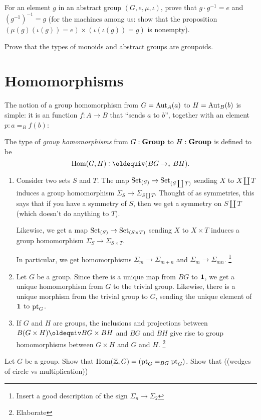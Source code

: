   \begin{xca}
    For an element $g$ in an abstract group $(G,e,\mu,\iota)$, prove that $g\cdot g^{-1}=e$ and $(g^{-1})^{-1}=g$ (for the machines among us: show that the proposition
$
(\mu{}(g)(\iota{}(g))=e)\times
(\iota{}(\iota{}(g))=g)$ is nonempty).
  \end{xca}
  \begin{xca}\label{xca:typemonoidisgroupoid}
    Prove that the types of monoids and abstract groups are groupoids.
  \end{xca}



\section{Homomorphisms}
\label{sec:homomorphisms}


The notion of a group homomorphism from $G=\mathrm{Aut}_A(a)$ to $H=\mathrm{Aut}_B(b)$ is simple: it is an function $f:A\to B$ that ``sends $a$ to $b$'', \ie together with an element $p:a=_Bf(b)$:
\begin{definition}\label{def:grouphomomorphism}
  The type of \emph{group homomorphisms} from $G:\mathbf{Group}$ to $H:\mathbf{Group}$ is defined to be
$$\Hom(G,H)\defequi(BG\to_* BH).%
$$
\end{definition}
\begin{example}
  \begin{enumerate}
  \item   Consider two sets $S$ and $T$.  The map $\mathord{\mathrm{Set}}_{(S)}\to\mathord{\mathrm{Set}}_{(S\coprod T)}$ sending $X$ to $X\coprod T$ induces a group homomorphism $\Sigma_S\to\Sigma_{S\coprod T}$.
Thought of as symmetries, this says that if you have a symmetry of $S$, then we get a symmetry on $S\coprod T$ (which doesn't do anything to $T$).  

Likewise, we get a map $\mathord{\mathrm{Set}}_{(S)}\to\mathord{\mathrm{Set}}_{(S\times T)}$ sending $X$ to $X\times T$ induces a group homomorphism $\Sigma_S\to\Sigma_{S\times T}$. 

In particular, we get homomorphisms $\Sigma_m\to\Sigma_{m+n}$ and $\Sigma_m\to\Sigma_{mn}$. \footnote{Insert a good description of the sign $\Sigma_n\to\Sigma_2$}
\item Let $G$ be a group.  Since there is a unique map from $BG$ to $\mathbf{1} $, we get a unique homomorphism from $G$ to the trivial group.  Likewise, there is a unique morphism from the trivial group to $G$, sending the unique element of $\mathbf{1}$ to ${\mathord{\mathrm{pt}}}_G$. 
\item If $G$ and $H$ are groups, the inclusions and projections between $B(G\times H)\oldequiv BG\times BH$ and $BG$ and $BH$ give rise to group homomorphisms between $G\times H$ and $G$ and $H$.  \footnote{Elaborate}
  \end{enumerate}
\end{example}
\begin{xca}
  Let $G$ be a group.  Show that $\mathrm{Hom}(\mathbb{Z},G)=({\mathord{\mathrm{pt}}}_G=_{BG}{\mathord{\mathrm{pt}}}_G)$.  Show that ((wedges of circle vs multiplication))
\end{xca}

